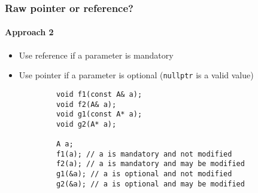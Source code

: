 \documentclass{beamer}
\begin{document}
\begin{frame}[fragile]
\frametitle{Raw pointer or reference?}
\framesubtitle{Approach 2}
    \begin{itemize}
    \item Use reference if a parameter is mandatory
    \item Use pointer if a parameter is optional (\texttt{nullptr} is a valid value)
    \end{itemize}
    \begin{example}
        \begin{lstlisting}
            void f1(const A& a);
            void f2(A& a);
            void g1(const A* a);
            void g2(A* a);

            A a;
            f1(a); // a is mandatory and not modified
            f2(a); // a is mandatory and may be modified
            g1(&a); // a is optional and not modified
            g2(&a); // a is optional and may be modified
        \end{lstlisting}
    \end{example}
\end{frame}
\end{document}
